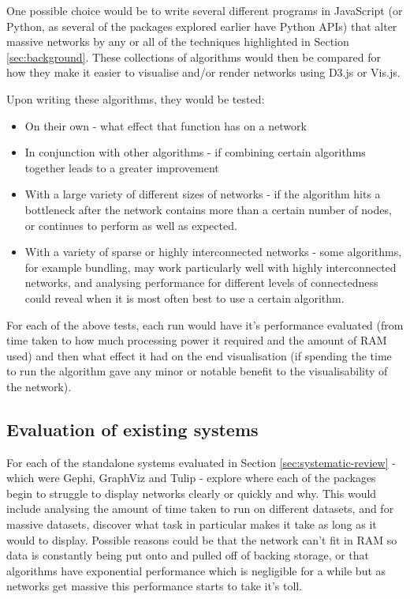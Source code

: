 \documentclass[../dissertation.tex]{subfiles}
\begin{document}
One possible choice would be to write several different programs in JavaScript (or Python, as several of the packages explored earlier have Python APIs) that alter massive networks by any or all of the techniques highlighted in Section \ref{sec:background}. These collections of algorithms would then be compared for how they make it easier to visualise and/or render networks using D3.js or Vis.js. 

Upon writing these algorithms, they would be tested:
\begin{itemize}
    \item On their own - what effect that function has on a network
    \item In conjunction with other algorithms - if combining certain algorithms together leads to a greater improvement
    \item With a large variety of different sizes of networks - if the algorithm hits a bottleneck after the network contains more than a certain number of nodes, or continues to perform as well as expected.
    \item With a variety of sparse or highly interconnected networks - some algorithms, for example bundling, may work particularly well with highly interconnected networks, and analysing performance for different levels of connectedness could reveal when it is most often best to use a certain algorithm.
\end{itemize}

For each of the above tests, each run would have it's performance evaluated (from time taken to how much processing power it required and the amount of RAM used) and then what effect it had on the end visualisation (if spending the time to run the algorithm gave any minor or notable benefit to the visualisability of the network).

\subsection{Evaluation of existing systems}

For each of the standalone systems evaluated in Section \ref{sec:systematic-review} - which were Gephi, GraphViz and Tulip - explore where each of the packages begin to struggle to display networks clearly or quickly and why. This would include analysing the amount of time taken to run on different datasets, and for massive datasets, discover what task in particular makes it take as long as it would to display. Possible reasons could be that the network can't fit in RAM so data is constantly being put onto and pulled off of backing storage, or that algorithms have exponential performance which is negligible for a while but as networks get massive this performance starts to take it's toll. 
\end{document}
